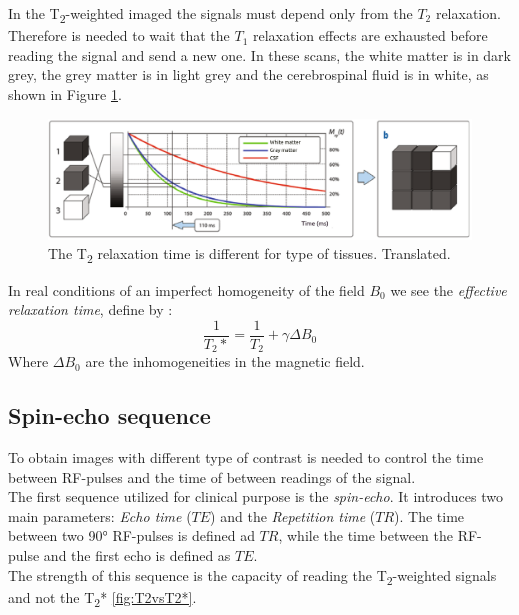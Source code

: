  In the T\textsubscript{2}-weighted imaged the signals must depend only from the $T_2$ relaxation. Therefore is needed to wait that the $T_1$ relaxation effects are exhausted before reading the signal and send a new one. In these scans, the white matter is in dark grey, the grey matter is in light grey and the cerebrospinal fluid is in white, as shown in Figure \ref{fig:T2_relax_tissues}.

 \begin{figure}[h]
    \centering
    \includegraphics[width=1\textwidth]{images/t2_relax_tissues.png}
    \caption{The T\textsubscript{2} relaxation time is different for type of tissues. \cite{elementiRisonanza} Translated.}
    \label{fig:T2_relax_tissues}
 \end{figure}

 \noindent In real conditions of an imperfect homogeneity of the field $B_0$ we see the \emph{effective relaxation time}, define by \cite{slides}:
 \begin{equation}
    \frac{1}{T_{2}*} = \frac{1}{T_2}+\gamma\Delta B_0
 \end{equation}
 Where $\Delta B_0$ are the inhomogeneities in the magnetic field.

 \subsection{Spin-echo sequence}
 To obtain images with different type of contrast is needed to control the time between RF-pulses and the time of between readings of the signal. \\
 The first sequence utilized for clinical purpose is the \emph{spin-echo}. It introduces two main parameters: \emph{Echo time} ($TE$) and the \emph{Repetition time} ($TR$). The time between two 90° RF-pulses is defined ad $TR$, while the time between the RF-pulse and the first echo is defined as $TE$.\\
 The strength of this sequence is the capacity of reading the T\textsubscript{2}-weighted signals and not the T\textsubscript{2}* \ref{fig:T2vsT2*}.


